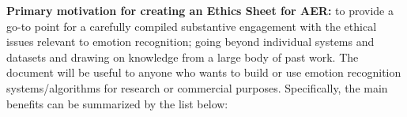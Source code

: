 \documentclass{clv3}
\begin{document}
%
%
\noindent \textbf{Primary motivation for creating an Ethics Sheet for AER:}
to provide a go-to point for a carefully compiled substantive engagement with the ethical issues relevant to emotion recognition; going beyond individual systems and datasets and drawing on knowledge from a large body of past work.
The document will be useful to anyone who wants to build or use emotion recognition systems/algorithms for research or commercial purposes. %
Specifically, the main benefits can be summarized by the list below:\\[-18pt]
\end{document}
